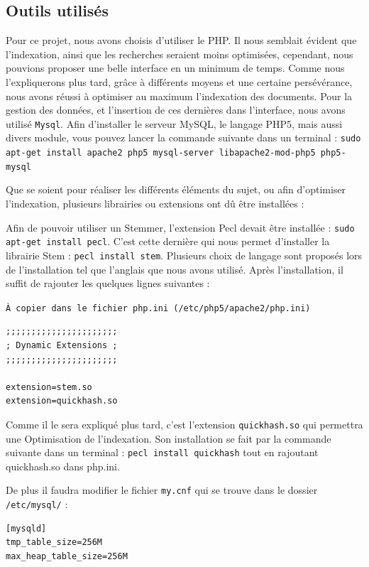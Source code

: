\documentclass[11pt,a4paper]{article}
\begin{document}
\subsection{Outils utilisés}
Pour ce projet, nous avons choisis d'utiliser le PHP. Il nous semblait évident que l'indexation, ainsi que les recherches seraient moins optimisées, cependant, nous pouvions proposer une belle interface en un minimum de temps.
\newline
Comme nous l'expliquerons plus tard, grâce à différents moyens et une certaine persévérance, nous avons réussi à optimiser au maximum l'indexation des documents.
\medbreak
Pour la gestion des données, et l'insertion de ces dernières dans l'interface, nous avons utilisé \verb|Mysql|.
Afin d'installer le serveur MySQL, le langage PHP5, mais aussi divers module, vous pouvez lancer la commande suivante dans un terminal :
\newline
\verb|sudo apt-get install apache2 php5 mysql-server libapache2-mod-php5 php5-mysql|

\medbreak
Que se soient pour réaliser les différents éléments du sujet, ou afin d'optimiser l'indexation, plusieurs librairies ou extensions ont dû être installées : 

Afin de pouvoir utiliser un Stemmer, l'extension Pecl devait être installée : \verb|sudo apt-get install pecl|. 
C'est cette dernière qui nous permet d'installer la librairie Stem : \verb|pecl install stem|.
\newline
Plusieurs choix de langage sont proposés lors de l'installation tel que l'anglais que nous avons utilisé.
Après l'installation, il suffit de rajouter les quelques lignes suivantes :
\newline

\verb|À copier dans le fichier php.ini (/etc/php5/apache2/php.ini)|
\begin{lstlisting}
;;;;;;;;;;;;;;;;;;;;;;
; Dynamic Extensions ;
;;;;;;;;;;;;;;;;;;;;;;

extension=stem.so
extension=quickhash.so

\end{lstlisting}

Comme il le sera expliqué plus tard, c'est l'extension \verb|quickhash.so| qui permettra une Optimisation de l'indexation. Son installation se fait par la commande suivante dans un terminal : 
\verb|pecl install quickhash| tout en rajoutant quickhash.so dans php.ini.

De plus il faudra modifier le fichier \verb|my.cnf| qui se trouve dans le dossier \verb|/etc/mysql/| :
\begin{lstlisting}
[mysqld]
tmp_table_size=256M
max_heap_table_size=256M
\end{lstlisting}
\end{document}
